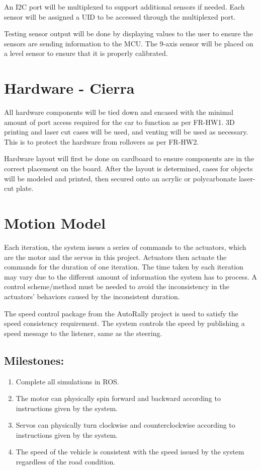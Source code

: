 \documentclass[compsoc,draftclsnofoot,onecolumn,10pt]{IEEEtran}
\begin{document}
An I2C port will be multiplexed to support additional sensors if needed. 
Each sensor will be assigned a UID to be accessed through the multiplexed port. \par

Testing sensor output will be done by displaying values to the user to ensure the sensors are sending information to the MCU. The 9-axis sensor will be placed on a level sensor to ensure that it is properly calibrated. \par

\section{Hardware - Cierra}
All hardware components will be tied down and encased with the minimal amount of port access required for the car to function as per FR-HW1. 3D printing and laser cut cases will be used, and venting will be used as necessary. This is to protect the hardware from rollovers as per FR-HW2. \par
Hardware layout will first be done on cardboard to ensure components are in the correct placement on the board. 
After the layout is determined, cases for objects will be modeled and printed, then secured onto an acrylic or polycarbonate laser-cut plate. \par

\section{Motion Model}
Each iteration, the system issues a series of commands to the actuators, which are the motor and the servos in this project. Actuators then actuate the commands for the duration of one iteration. The time taken by each iteration may vary due to the different amount of information the system has to process. A control scheme/method must be needed to avoid the inconsistency in the actuators’ behaviors caused by the inconsistent duration.\par
The speed control package from the AutoRally project is used to satisfy the speed consistency requirement. The system controls the speed by publishing a speed message to the listener, same as the steering.\par
\subsection{Milestones:}
\begin{enumerate}
	\item Complete all simulations in ROS.
	\item The motor can physically spin forward and backward according to instructions given by the system.
	\item Servos can physically turn clockwise and counterclockwise according to instructions given by the system.
	\item The speed of the vehicle is consistent with the speed issued by the system regardless of the road condition.
\end{enumerate} 
\end{document}
